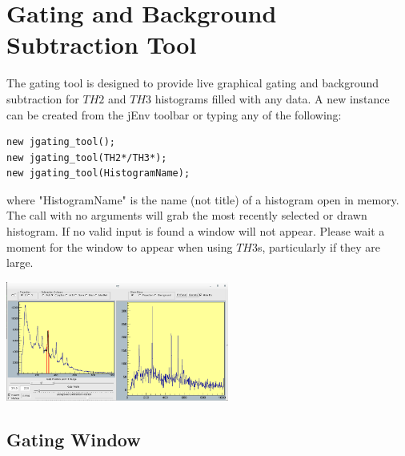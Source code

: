 \documentclass[a4paper,10pt]{article}
\begin{document}
\section{Gating and Background Subtraction Tool}
The gating tool is designed to provide live graphical gating and background subtraction for $TH2$ and $TH3$ histograms filled with any data. 
A new instance can be created from the jEnv toolbar or typing any of the following:
\lstset{language=C++}
\begin{lstlisting}
new jgating_tool();
new jgating_tool(TH2*/TH3*);
new jgating_tool(HistogramName);
\end{lstlisting}
where "HistogramName" is the name (not title) of a histogram open in memory. The call with no arguments will grab the most recently selected or drawn histogram. If no valid input is found a window will not appear. Please wait a moment for the window to appear when using $TH3$s, particularly if they are large.
\begin{center}
\includegraphics[width=0.55\textwidth]{jGateG.png}
\end{center}

\subsection{Gating Window}
\end{document}
